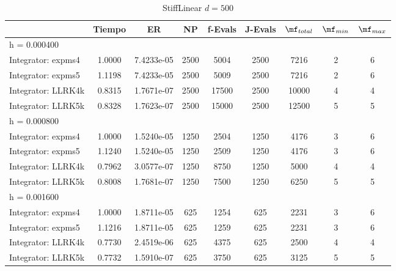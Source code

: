 \begin{table}[htb]
	\centering
\begin{tabular}{l|c|c|c|c|c|c|c|c}
\hline
& Tiempo & ER & NP & f-Evals & J-Evals & $\mf_{total}$ & $\mf_{min}$ & $\mf_{max}$ \\
\hline h = 0.000400 &  &  &  &  &  &  &  &  \\
 Integrator: expms4 & 1.0000 & 7.4233e-05 & 2500 & 5004 & 2500 & 7216 & 2 & 6  \\
Integrator: expms5 & 1.1198 & 7.4233e-05 & 2500 & 5009 & 2500 & 7216 & 2 & 6  \\
Integrator: LLRK4k & 0.8315 & 1.7671e-07 & 2500 & 17500 & 2500 & 10000 & 4 & 4  \\
Integrator: LLRK5k & 0.8328 & 1.7623e-07 & 2500 & 15000 & 2500 & 12500 & 5 & 5  \\
\hline
\hline h = 0.000800 &  &  &  &  &  &  &  &  \\
 Integrator: expms4 & 1.0000 & 1.5240e-05 & 1250 & 2504 & 1250 & 4176 & 3 & 6  \\
Integrator: expms5 & 1.1240 & 1.5240e-05 & 1250 & 2509 & 1250 & 4176 & 3 & 6  \\
Integrator: LLRK4k & 0.7962 & 3.0577e-07 & 1250 & 8750 & 1250 & 5000 & 4 & 4  \\
Integrator: LLRK5k & 0.8008 & 1.7681e-07 & 1250 & 7500 & 1250 & 6250 & 5 & 5  \\
\hline
\hline h = 0.001600 &  &  &  &  &  &  &  &  \\
 Integrator: expms4 & 1.0000 & 1.8711e-05 & 625 & 1254 & 625 & 2231 & 3 & 6  \\
Integrator: expms5 & 1.1216 & 1.8711e-05 & 625 & 1259 & 625 & 2231 & 3 & 6  \\
Integrator: LLRK4k & 0.7730 & 2.4519e-06 & 625 & 4375 & 625 & 2500 & 4 & 4  \\
Integrator: LLRK5k & 0.7732 & 1.5910e-07 & 625 & 3750 & 625 & 3125 & 5 & 5  \\
\hline
\end{tabular}
\caption{StiffLinear $d=500$}
\end{table}
